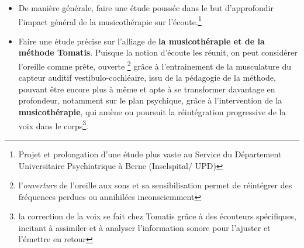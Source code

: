 \begin{itemize}
      
       
\item De manière générale, faire une étude poussée dans le but d'approfondir l'impact général de la
  musicothérapie sur l'écoute.\footnote{ Projet et 
  prolongation d'une étude plus vaste au Service du
  Département Universitaire Psychiatrique à Berne (Inselspital/ UPD) }
   \item
     Faire une étude précise sur l'alliage de \textbf{la
       musicothérapie et de la méthode Tomatis}. Puisque la notion d'écoute les réunit, on
     peut considérer l'oreille comme 
prête, ouverte \footnote{l'\emph{ouverture} de l'oreille
aux sons et sa sensibilisation permet de réintégrer
des fréquences perdues ou annihilées inconsciemment} grâce à l'entrainement de la musculature du capteur auditif
vestibulo-cochléaire, issu de la pédagogie de la méthode, pouvant 
être encore plus à
même et apte à se transformer davantage en profondeur, notamment sur le
plan psychique, grâce à l'intervention de la \textbf{musicothérapie}, qui amène
ou poursuit la réintégration progressive de la voix  dans
le corps\footnote{ la correction de
la voix se fait chez Tomatis grâce à des écouteurs spécifiques, incitant à
assimiler et à analyser l'information sonore pour l'ajuster et
l'émettre en retour }.



\end{itemize}

